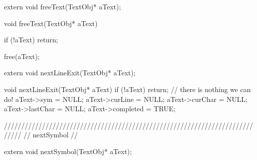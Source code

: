 \startCHeader
extern void freeText(TextObj* aText);
\stopCHeader

\startCCode
void freeText(TextObj* aText) {
  if (!aText) return;

  free(aText);
}
\stopCCode

\startCHeader
extern void nextLineExit(TextObj* aText);
\stopCHeader
{}

\startCCode
void nextLineExit(TextObj* aText) {
  if (!aText) return; // there is nothing we can do!
  aText->sym       = NULL;
  aText->curLine   = NULL;
  aText->curChar   = NULL;
  aText->lastChar  = NULL;
  aText->completed = TRUE;
}
\stopCCode

/////////////////////////////////////////////////////////////////////////////
// nextSymbol
//

\startCHeader
extern void nextSymbol(TextObj* aText);
\stopCHeader

